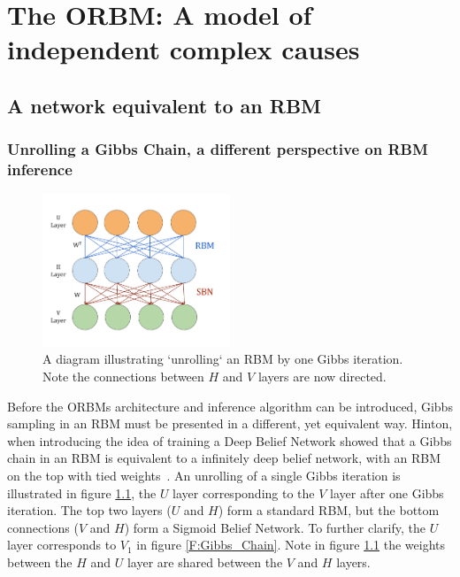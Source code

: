 \chapter{The ORBM: A model of independent complex causes}

\section{A network equivalent to an RBM}

\subsection{Unrolling a Gibbs Chain, a different perspective on RBM inference}

\begin{figure}
  \begin{center}
    \includegraphics[width=0.5\textwidth]{Assets/3_Layer_RBM.png}
  \end{center}
  \caption{A diagram illustrating `unrolling` an RBM by one Gibbs iteration. Note the connections between $H$ and $V$ layers are now directed.}
  \label{F:3-Layer-RBM}
\end{figure}

Before the ORBMs architecture and inference algorithm can be introduced, Gibbs sampling in an RBM must be presented in a different, yet equivalent way.
Hinton, when introducing the idea of training a Deep Belief Network showed that a Gibbs chain in an RBM is equivalent to a infinitely deep belief network, with an RBM on the top with tied weights~\cite{hinton2006reducing}. An unrolling of a single Gibbs iteration is illustrated in figure \ref{F:3-Layer-RBM}, the $U$ layer corresponding to the $V$ layer after one Gibbs iteration. The top two layers ($U$ and $H$) form a standard RBM, but the bottom connections ($V$ and $H$) form a Sigmoid Belief Network. To further clarify, the $U$ layer corresponds to $V_1$ in figure \ref{F:Gibbs_Chain}. Note in figure \ref{F:3-Layer-RBM} the weights between the $H$ and $U$ layer are shared between the $V$ and $H$ layers.

